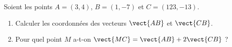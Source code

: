 
\begin{exercice}\label{exosmath-0448}

    Soient les points \( A=(3,4)\), \( B=(1,-7)\) et \( C=(123,-13)\).
    \begin{enumerate}
        \item
            Calculer les coordonnées des vecteurs \(  \vect{ AB }   \) et \( \vect{ CB }\).
        \item
            Pour quel point \( M\) a-t-on \( \vect{ MC }=\vect{ AB }+2\vect{ CB }\) ?
    \end{enumerate}

\end{exercice}
